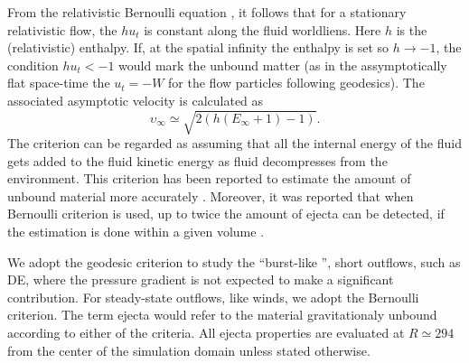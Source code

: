 From the relativistic Bernoulli equation \citep{Rezzolla:2013}, it follows
that for a stationary relativistic flow, the $hu_t$ is constant along the 
fluid worldliens. Here $h$ is the (relativistic) enthalpy. 
%
If, at the spatial infinity the enthalpy is set so $h\rightarrow-1$, 
the condition $hu_t < -1$ would mark the unbound matter 
(as in the assymptotically flat space-time the 
$u_t = -W$ for the flow particles following geodesics).
%
The associated asymptotic velocity is calculated as 
%
\begin{equation}
\upsilon_{\infty} \simeq \sqrt{2 (h (E_{\infty}+1)-1)}. 
\end{equation}
%
The criterion can be regarded as assuming that all the internal energy of 
the fluid gets added to the fluid kinetic energy as fluid decompresses from 
the \pmerg{} environment. 
%
%
This criterion has been reported to estimate the amount of unbound material more accurately
\citep{Foucart:2015gaa}. 
Moreover, it was reported that when Bernoulli criterion is used, 
up to twice the amount of ejecta can be detected,  
if the estimation is done within a given volume \citep{Kastaun:2014fna}.



We adopt the geodesic criterion to study the ``burst-like '', short outflows,
such as \ac{DE}, where the pressure gradient is not expected to make a significant contribution.
For steady-state outflows, like \pmerg{} winds, we adopt the Bernoulli criterion.
%
The term ejecta would refer to the material gravitationaly 
unbound according to either of the criteria.
%
All ejecta properties are evaluated at $R \simeq 294$ from the center of the 
simulation domain unless stated otherwise. 



